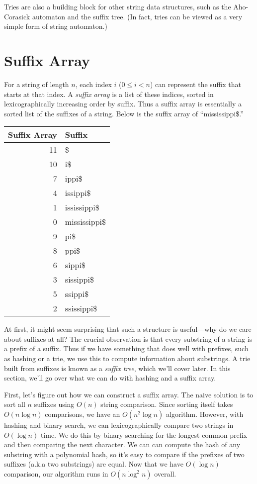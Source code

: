 Tries are also a building block for other string data structures, such as the Aho-Corasick automaton and the suffix tree. (In fact, tries can be viewed as a very simple form of string automaton.)

\section{Suffix Array}

For a string of length $n$, each index $i$ ($0 \le i < n$) can represent the suffix that starts at that index. A \emph{suffix array} is a list of these indices, sorted in lexicographically increasing order by suffix. Thus a suffix array is essentially a sorted list of the suffixes of a string. Below is the suffix array of ``mississippi\$.''

\begin{center}
  \begin{tabular}{r | l}
    Suffix Array & Suffix \phantom{moooooooooo} \\ \hline
    11 & \$ \\
    10 & i\$ \\
    7 & ippi\$ \\
    4 & issippi\$ \\
    1 & ississippi\$ \\
    0 & mississippi\$ \\
    9 & pi\$ \\
    8 & ppi\$ \\
    6 & sippi\$ \\
    3 & sissippi\$ \\
    5 & ssippi\$ \\
    2 & ssissippi\$ \\
  \end{tabular}
\end{center}

At first, it might seem surprising that such a structure is useful---why do we care about suffixes at all? The crucial observation is that every substring of a string is a prefix of a suffix. Thus if we have something that does well with prefixes, such as hashing or a trie, we use this to compute information about substrings. A trie built from suffixes is known as a \emph{suffix tree}, which we'll cover later. In this section, we'll go over what we can do with hashing and a suffix array.

First, let's figure out how we can construct a suffix array. The naive solution is to sort all $n$ suffixes using $O(n)$ string comparison. Since sorting itself takes $O(n \log n)$ comparisons, we have an $O(n^2 \log n)$ algorithm. However, with hashing and binary search, we can lexicographically compare two strings in $O(\log n)$ time. We do this by binary searching for the longest common prefix and then comparing the next character. We can can compute the hash of any substring with a polynomial hash, so it's easy to compare if the prefixes of two suffixes (a.k.a two substrings) are equal. Now that we have $O(\log n)$ comparison, our algorithm runs in $O(n \log^2 n)$ overall.

